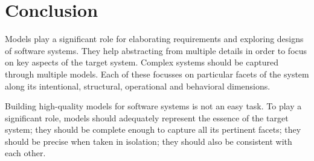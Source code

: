 \chapter{Conclusion\label{chapter:conclusion}}

Models play a significant role for elaborating requirements and exploring designs of software systems. They help abstracting from multiple details in order to focus on key aspects of the target system. Complex systems should be captured through multiple models. Each of these focusses on particular facets of the system along its intentional, structural, operational and behavioral dimensions.

Building high-quality models for software systems is not an easy task. To play a significant role, models should adequately represent the essence of the target system; they should be complete enough to capture all its pertinent facets; they should be precise when taken in isolation; they should also be consistent with each other. 

